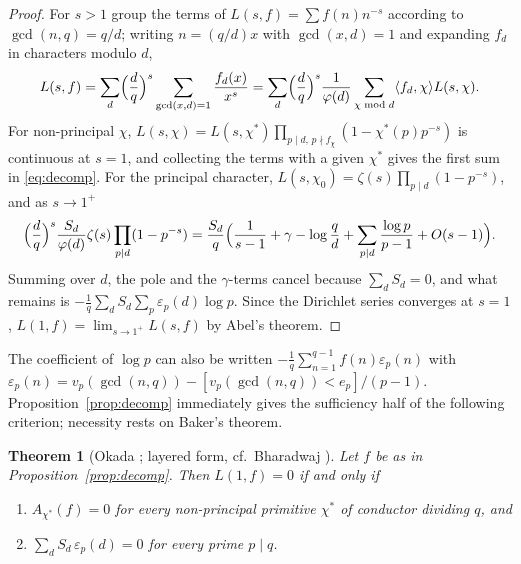 \documentclass[11pt]{amsart}
\newtheorem{theorem}{Theorem}[section]
\theoremstyle{definition}
\theoremstyle{remark}
\newcommand{\ip}[2]{\langle #1,#2\rangle}
\numberwithin{equation}{section}
\begin{document}
\begin{proof}
For $s>1$ group the terms of $L(s,f)=\sum f(n)n^{-s}$ according to $\gcd(n,q)=q/d$; writing $n=(q/d)x$ with $\gcd(x,d)=1$ and expanding $f_d$ in characters modulo $d$,
\[
L(s,f)=\sum_{d}\Bigl(\frac dq\Bigr)^{s}\sum_{\gcd(x,d)=1}\frac{f_d(x)}{x^{s}}
=\sum_d\Bigl(\frac dq\Bigr)^{s}\frac1{\varphi(d)}\sum_{\chi\bmod d}\ip{f_d}{\chi}L(s,\chi).
\]
For non-principal $\chi$, $L(s,\chi)=L(s,\chi^*)\prod_{p\mid d,\,p\nmid f_\chi}(1-\chi^*(p)p^{-s})$ is continuous at $s=1$, and collecting the terms with a given $\chi^*$ gives the first sum in \eqref{eq:decomp}.
For the principal character, $L(s,\chi_0)=\zeta(s)\prod_{p\mid d}(1-p^{-s})$, and as $s\to1^+$
\[
\Bigl(\frac dq\Bigr)^{s}\frac{S_d}{\varphi(d)}\zeta(s)\prod_{p\mid d}(1-p^{-s})
=\frac{S_d}{q}\Bigl(\frac1{s-1}+\gamma-\log\frac qd+\sum_{p\mid d}\frac{\log p}{p-1}+O(s-1)\Bigr).
\]
Summing over $d$, the pole and the $\gamma$-terms cancel because $\sum_dS_d=0$, and what remains is $-\frac1q\sum_dS_d\sum_{p}\varepsilon_p(d)\log p$.
Since the Dirichlet series converges at $s=1$, $L(1,f)=\lim_{s\to1^+}L(s,f)$ by Abel's theorem.
\end{proof}

The coefficient of $\log p$ can also be written $-\frac1q\sum_{n=1}^{q-1}f(n)\varepsilon_p(n)$ with $\varepsilon_p(n)=v_p(\gcd(n,q))-[v_p(\gcd(n,q))<e_p]/(p-1)$.
Proposition~\ref{prop:decomp} immediately gives the sufficiency half of the following criterion; necessity rests on Baker's theorem.

\begin{theorem}[Okada \cite{Oka82}; layered form, cf.\ Bharadwaj {\cite[Thm.~4]{Bha22}}]\label{thm:okada}
Let $f$ be as in Proposition~\ref{prop:decomp}.
Then $L(1,f)=0$ if and only if
\begin{enumerate}
\item[(A)] $A_{\chi^*}(f)=0$ for every non-principal primitive $\chi^*$ of conductor dividing $q$, and
\item[(B)] $\sum_{d}S_d\,\varepsilon_p(d)=0$ for every prime $p\mid q$.
\end{enumerate}
\end{theorem}
\end{document}

